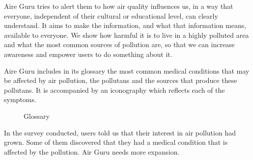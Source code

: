 Aire Guru tries to alert them to how air quality influences us, in a way that everyone, independent of their cultural or educational level,
can clearly understand. It aims to make the information, and what that information means, available to everyone. We show how harmful it is to live in a highly polluted area and what the most common sources of pollution
are, so that we can increase awareness and empower users to do something about it.


Aire Guru includes in its glossary the most common medical conditions that may be affected by air pollution, the pollutans and the sources that produce these pollutans. It is accompanied by an iconography
which reflects each of the symptoms. \\

\begin{figure}[ht]
    \centering
    \hfill
  
  \caption{Glossary}
    \end{figure}
\begin{itemize}
    \done In the survey conducted, users told us that their interest in air pollution had grown. Some of them discovered that they had a medical condition that is affected by the pollution.
    \crossed Air Guru needs more expansion.
    
\end{itemize}